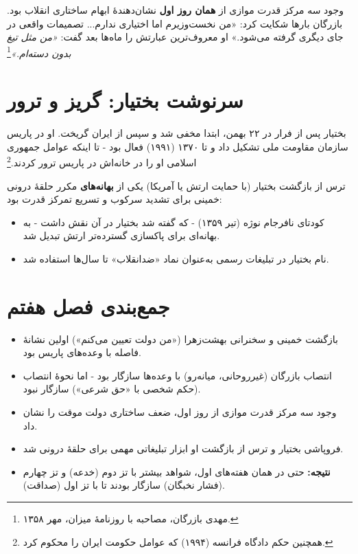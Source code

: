 \documentclass[12pt,a4paper]{book}
\newcommand{\keyword}[1]{\textbf{\textcolor{cPrimary}{#1}}}
\newcommand{\en}[1]{\lr{\textit{#1}}}
\begin{document}
\begin{noteBox}
وجود سه مرکز قدرت موازی از \keyword{همان روز اول} نشان‌دهندهٔ ابهام ساختاری انقلاب بود. بازرگان بارها شکایت کرد: «من نخست‌وزیرم اما اختیاری ندارم... تصمیمات واقعی در جای دیگری گرفته می‌شود.» او معروف‌ترین عبارتش را ماه‌ها بعد گفت: \textit{«من مثل تیغ بدون دسته‌ام.»}\footnote{مهدی بازرگان، مصاحبه با روزنامهٔ میزان، مهر ۱۳۵۸.}
\end{noteBox}

\section{سرنوشت بختیار: گریز و ترور}

بختیار پس از فرار در ۲۲ بهمن، ابتدا مخفی شد و سپس از ایران گریخت. او در پاریس سازمان مقاومت ملی تشکیل داد و تا ۱۳۷۰ (۱۹۹۱) فعال بود - تا اینکه عوامل جمهوری اسلامی او را در خانه‌اش در پاریس ترور کردند.\footnote{\en{Bakhash (1984), pp.\,48--52;} همچنین حکم دادگاه فرانسه (۱۹۹۴) که عوامل حکومت ایران را محکوم کرد.}

ترس از بازگشت بختیار (با حمایت ارتش یا آمریکا) یکی از \keyword{بهانه‌های} مکرر حلقهٔ درونی خمینی برای تشدید سرکوب و تسریع تمرکز قدرت بود:

\begin{itemize}[label=\textcolor{cAccent}{$\blacktriangleright$}, rightmargin=2em]
    \item کودتای نافرجام نوژه (تیر ۱۳۵۹) - که گفته شد بختیار در آن نقش داشت - به بهانه‌ای برای پاکسازی گسترده‌تر ارتش تبدیل شد.
    \item نام بختیار در تبلیغات رسمی به‌عنوان نماد «ضدانقلاب» تا سال‌ها استفاده شد.
\end{itemize}

\section{جمع‌بندی فصل هفتم}

\begin{principleBox}
\begin{itemize}[label=\textcolor{cPrimary}{$\blacksquare$}, rightmargin=2em]
    \item بازگشت خمینی و سخنرانی بهشت‌زهرا («من دولت تعیین می‌کنم») اولین نشانهٔ فاصله با وعده‌های پاریس بود.
    \item انتصاب بازرگان (غیرروحانی، میانه‌رو) با وعده‌ها سازگار بود - اما نحوهٔ انتصاب (حکم شخصی با «حق شرعی») سازگار نبود.
    \item وجود سه مرکز قدرت موازی از روز اول، ضعف ساختاری دولت موقت را نشان داد.
    \item فروپاشی بختیار و ترس از بازگشت او ابزار تبلیغاتی مهمی برای حلقهٔ درونی شد.
    \item \keyword{نتیجه:} حتی در همان هفته‌های اول، شواهد بیشتر با تز دوم (خدعه) و تز چهارم (فشار نخبگان) سازگار بودند تا با تز اول (صداقت).
\end{itemize}
\end{principleBox}
\end{document}
